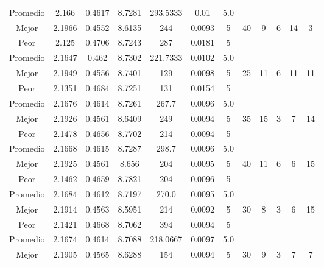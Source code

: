 \begin{table}[h!]
\begin{center}
\begin{tabular}{|c|c|c|c|c|c|c|c|c|c|c|c|}
        \hline
        \hline
            Promedio  & 2.166 & 0.4617 & 8.7281 & 293.5333 & 0.01 & 5.0 &  &  &  &  & \\
            \cline{1-7}
            Mejor & 2.1966 & 0.4552  & 8.6135 & 244 & 0.0093 & 5 & 40 & 9 & 6 & 14 & 3\\
            \cline{1-7}
            Peor & 2.125 & 0.4706  & 8.7243 & 287 & 0.0181 & 5 &  &  &  &  & \\
        \hline
        \hline
            Promedio  & 2.1647 & 0.462 & 8.7302 & 221.7333 & 0.0102 & 5.0 &  &  &  &  & \\
            \cline{1-7}
            Mejor & 2.1949 & 0.4556  & 8.7401 & 129 & 0.0098 & 5 & 25 & 11 & 6 & 11 & 11\\
            \cline{1-7}
            Peor & 2.1351 & 0.4684  & 8.7251 & 131 & 0.0154 & 5 &  &  &  &  & \\
        \hline
        \hline
            Promedio  & 2.1676 & 0.4614 & 8.7261 & 267.7 & 0.0096 & 5.0 &  &  &  &  & \\
            \cline{1-7}
            Mejor & 2.1926 & 0.4561  & 8.6409 & 249 & 0.0094 & 5 & 35 & 15 & 3 & 7 & 14\\
            \cline{1-7}
            Peor & 2.1478 & 0.4656  & 8.7702 & 214 & 0.0094 & 5 &  &  &  &  & \\
        \hline
        \hline
            Promedio  & 2.1668 & 0.4615 & 8.7287 & 298.7 & 0.0096 & 5.0 &  &  &  &  & \\
            \cline{1-7}
            Mejor & 2.1925 & 0.4561  & 8.656 & 204 & 0.0095 & 5 & 40 & 11 & 6 & 6 & 15\\
            \cline{1-7}
            Peor & 2.1462 & 0.4659  & 8.7821 & 204 & 0.0096 & 5 &  &  &  &  & \\
        \hline
        \hline
            Promedio  & 2.1684 & 0.4612 & 8.7197 & 270.0 & 0.0095 & 5.0 &  &  &  &  & \\
            \cline{1-7}
            Mejor & 2.1914 & 0.4563  & 8.5951 & 214 & 0.0092 & 5 & 30 & 8 & 3 & 6 & 15\\
            \cline{1-7}
            Peor & 2.1421 & 0.4668  & 8.7062 & 394 & 0.0094 & 5 &  &  &  &  & \\
        \hline
        \hline
            Promedio  & 2.1674 & 0.4614 & 8.7088 & 218.0667 & 0.0097 & 5.0 &  &  &  &  & \\
            \cline{1-7}
            Mejor & 2.1905 & 0.4565  & 8.6288 & 154 & 0.0094 & 5 & 30 & 9 & 3 & 7 & 7\\

\end{tabular}
\end{center}
\end{table}
